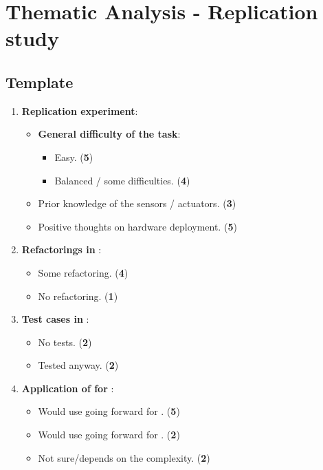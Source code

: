 \chapter{Thematic Analysis - Replication study}
\label{appendix:E_Thematic_Analysis_Replication}
\section{Template}
\begin{enumerate}
    \item \textbf{Replication experiment}:
    \begin{itemize}
        \item \textbf{General difficulty of the task}:
        \begin{itemize}
            \item Easy. (\textbf{5})
            \item Balanced / some difficulties. (\textbf{4})
        \end{itemize}
        \item Prior knowledge of the sensors / actuators. (\textbf{3})
        \item Positive thoughts on hardware deployment. (\textbf{5})
    \end{itemize}

    \item \textbf{Refactorings in \tdd}:
    \begin{itemize}
        \item Some refactoring. (\textbf{4})
        \item No refactoring. (\textbf{1})
    \end{itemize}

    \item \textbf{Test cases in \notdd}:
    \begin{itemize}
        \item No tests. (\textbf{2})
        \item Tested anyway. (\textbf{2})
    \end{itemize}

    \item \textbf{Application of \tdd for \ess}:
    \begin{itemize}
        \item Would use \tdd going forward for \ess. (\textbf{5})
        \item Would use \notdd going forward for \ess. (\textbf{2})
        \item Not sure/depends on the complexity. (\textbf{2})
    \end{itemize}


\end{enumerate}
